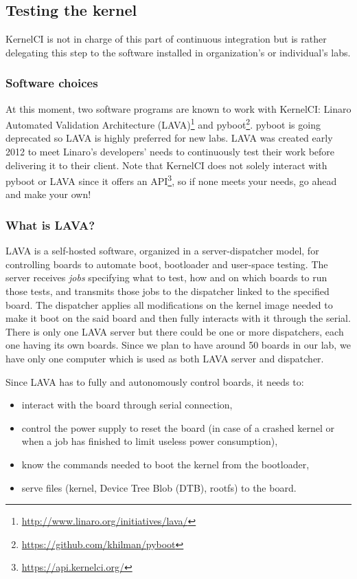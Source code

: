 \subsection{Testing the kernel}

KernelCI is not in charge of this part of continuous integration but is rather delegating this step to the software installed in organization's or individual's labs.

\subsubsection{Software choices}

At this moment, two software programs are known to work with KernelCI: Linaro Automated Validation Architecture (LAVA)\footnote{\url{http://www.linaro.org/initiatives/lava/}} and pyboot\footnote{\url{https://github.com/khilman/pyboot}}. pyboot is going deprecated so LAVA is highly preferred for new labs. LAVA was created early 2012 to meet Linaro's developers' needs to continuously test their work before delivering it to their client. Note that KernelCI does not solely interact with pyboot or LAVA since it offers an API\footnote{\url{https://api.kernelci.org/}}, so if none meets your needs, go ahead and make your own!

\subsubsection{What is LAVA?}

LAVA is a self-hosted software, organized in a server-dispatcher model, for controlling boards to automate boot, bootloader and user-space testing. The server receives \textit{jobs} specifying what to test, how and on which boards to run those tests, and transmits those jobs to the dispatcher linked to the specified board. The dispatcher applies all modifications on the kernel image needed to make it boot on the said board and then fully interacts with it through the serial. There is only one LAVA server but there could be one or more dispatchers, each one having its own boards. Since we plan to have around 50 boards in our lab, we have only one computer which is used as both LAVA server and dispatcher.

Since LAVA has to fully and autonomously control boards, it needs to:
\begin{itemize}
  \item interact with the board through serial connection,
  \item control the power supply to reset the board (in case of a crashed kernel or when a job has finished to limit useless power consumption),
  \item know the commands needed to boot the kernel from the bootloader,
  \item serve files (kernel, Device Tree Blob (DTB), rootfs) to the board.
\end{itemize}

